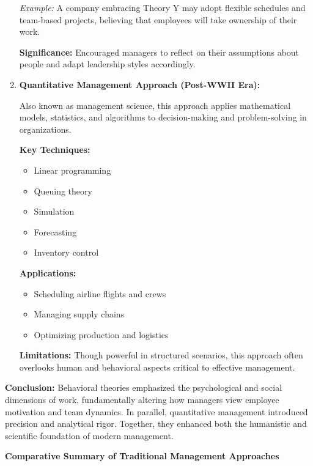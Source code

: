 \documentclass[10pt,a4paper]{book}
\begin{document}
\begin{enumerate}
    \textit{Example:} A company embracing Theory Y may adopt flexible schedules and team-based projects, believing that employees will take ownership of their work.

    \textbf{Significance:} Encouraged managers to reflect on their assumptions about people and adapt leadership styles accordingly.

    \item \textbf{Quantitative Management Approach (Post-WWII Era):}

    Also known as management science, this approach applies mathematical models, statistics, and algorithms to decision-making and problem-solving in organizations.

    \textbf{Key Techniques:}
    \begin{itemize}
        \item Linear programming
        \item Queuing theory
        \item Simulation
        \item Forecasting
        \item Inventory control
    \end{itemize}

    \textbf{Applications:}
    \begin{itemize}
        \item Scheduling airline flights and crews
        \item Managing supply chains
        \item Optimizing production and logistics
    \end{itemize}

    \textbf{Limitations:} Though powerful in structured scenarios, this approach often overlooks human and behavioral aspects critical to effective management.

\end{enumerate}

\textbf{Conclusion:} Behavioral theories emphasized the psychological and social dimensions of work, fundamentally altering how managers view employee motivation and team dynamics. In parallel, quantitative management introduced precision and analytical rigor. Together, they enhanced both the humanistic and scientific foundation of modern management.


\textbf{Comparative Summary of Traditional Management Approaches}
\end{document}
